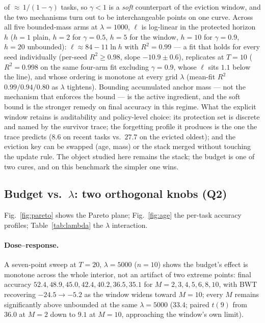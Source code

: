 \documentclass[review,12pt,number]{elsarticle}
\begin{document}
of ${\approx}\,1/(1-\gamma)$ tasks, so $\gamma{<}1$ is a \emph{soft}
counterpart of the eviction window, and the two mechanisms turn out to
be interchangeable points on one curve. Across all five bounded-mass
arms at $\lambda{=}1000$, $\ell$ is log-linear in the protected
horizon $h$ ($h{=}1$ plain, $h{=}2$ for $\gamma{=}0.5$, $h{=}5$ for
the window, $h{=}10$ for $\gamma{=}0.9$, $h{=}20$ unbounded):
$\ell \approx 84 - 11\ln h$ with $R^2{=}0.99$ --- a fit that holds for
every seed individually (per-seed $R^2 \geq 0.98$, slope
$-10.9\pm0.6$), replicates at $T{=}10$ ($R^2{=}0.998$ on the same
four-arm fit excluding $\gamma{=}0.9$, whose $\ell$ sits $1.1$ below
the line), and whose
ordering is monotone at every grid $\lambda$ (mean-fit $R^2$
$0.99/0.94/0.80$ as $\lambda$ tightens). Bounding accumulated anchor
mass --- not
the mechanism that enforces the bound --- is the active ingredient,
and the soft bound is the stronger remedy on final accuracy in this
regime. What the explicit window retains is auditability and
policy-level choice: its protection set is discrete and named by the
survivor trace; the forgetting profile it produces is the one the
trace predicts ($8.6$ on recent tasks vs.\ $27.7$ on the evicted
oldest); and the eviction key can be swapped (age, mass) or the stack
merged without touching the update rule. The object studied here
remains the stack; the budget is one of two cures, and on this
benchmark the simpler one wins.

\subsection{Budget vs.\ $\lambda$: two orthogonal knobs (Q2)}
\label{sec:exp-knobs}

Fig.~\ref{fig:pareto} shows the Pareto plane; Fig.~\ref{fig:age} the
per-task accuracy profiles; Table~\ref{tab:lambda} the $\lambda$
interaction.

\paragraph{Dose--response.}
A seven-point sweep at $T{=}20$, $\lambda{=}5000$ ($n{=}10$) shows the
budget's effect is monotone across the whole interior, not an artifact
of two extreme points: final accuracy $52.4, 48.9, 45.0, 42.4, 40.2,
36.5, 35.1$ for $M{=}2,3,4,5,6,8,10$, with BWT recovering
$-24.5 \to -5.2$ as the window widens toward $M{=}10$; every $M$
remains significantly above unbounded at the same
$\lambda{=}5000$ ($33.4$; paired $t(9)$ from $36.0$ at $M{=}2$ down
to $9.1$ at $M{=}10$, approaching the window's own limit).
\end{document}
